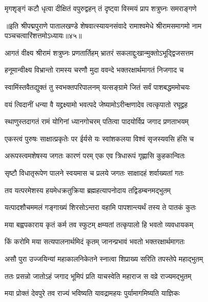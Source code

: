\twolineshloka
{मृगशृङ्गं कटौ धृत्वा दीक्षितं वपुरुद्वहन्}
{तं दृष्ट्वा विस्मयं प्राप शत्रुघ्नः समराङ्गणे}%

{॥इति श्रीपद्मपुराणे पातालखण्डे शेषवात्स्यायनसंवादे रामाश्वमेधे श्रीरामसमागमो नाम पञ्चचत्वारिंशत्तमोऽध्यायः॥४५॥}

\resetShloka


\twolineshloka
{आगतं वीक्ष्य श्रीरामं शत्रुघ्नः प्रणतार्तिहम्}
{भ्रातरं सकलाद्दुःखान्मुक्तोऽभूद्द्विजसत्तम}%

\twolineshloka
{हनूमान्वीक्ष्य विभ्रान्तो रामस्य चरणौ मुदा}
{ववन्दे भक्तरक्षार्थमागतं निजगाद च}%

\twolineshloka
{स्वामिंस्तवैतद्युक्तं तु स्वभक्तपरिपालनम्}
{यत्सङ्ग्रामे जितं सर्वं पाशबद्धममोचयः}%

\twolineshloka
{वयं त्विदानीं धन्या वै यद्द्रक्ष्यामो भवत्पदे}
{जेष्यामोऽरीन्क्षणादेव त्वत्कृपातो रघूद्वह}%


\twolineshloka
{स्थाणुस्तदागतं रामं योगिनां ध्यानगोचरम्}
{पतित्वा पादयोर्विप्र जगाद प्रणताभयम्}%

\twolineshloka
{एकस्त्वं पुरुषः साक्षात्प्रकृतेः पर ईर्यसे}
{यः स्वांशकलया विश्वं सृजस्यवसि हंसि च}%

\twolineshloka
{अरूपस्त्वमशेषस्य जगतः कारणं परम्}
{एक एव त्रिधारूपं गृह्णासि कुहकान्वितः}%

\twolineshloka
{सृष्टौ विधातृरूपेण पालने स्वयमास च}
{प्रलये जगतः साक्षादहं शर्वाख्यतां गतः}%

\twolineshloka
{तव यत्परमेशस्य हयमेधक्रतुक्रिया}
{ब्रह्महत्यापनोदाय तद्विडम्बनमद्भुतम्}%

\twolineshloka
{यत्पादशौचममलं गङ्गाख्यं शिरसोऽन्तरा}
{वहामि पापशान्त्यर्थं तस्य ते पातकं कुतः}%

\twolineshloka
{मया बह्वपकाराय कृतं कर्म तव स्फुटम्}
{क्षम्यतां तत्कृपालो हि भवतो व्यवधायकम्}%

\twolineshloka
{किं करोमि मया सत्यपालनार्थमिदं कृतम्}
{जानन्प्रभावं भवतो भक्तरक्षार्थमागतः}%

\twolineshloka
{असौ पुरा उज्जयिन्यां महाकालनिकेतने}
{स्नात्वा शिप्राख्य सरिति तपस्तेपे महाद्भुतम्}%

\twolineshloka
{ततः प्रसन्नो जातोऽहं जगाद भूमिपं प्रति}
{याचस्वेति महाराज स वव्रे राज्यमद्भुतम्}%

\twolineshloka
{मया प्रोक्तं देवपुरे तव राज्यं भविष्यति}
{यावद्रामहयः पुर्यामागमिष्यति याज्ञिकः}%

